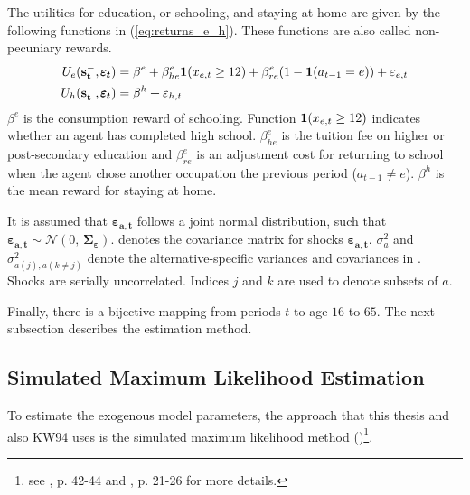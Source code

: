 The utilities for education, or schooling, and staying at home are given by the following functions in (\ref{eq:returns_e_h}). These functions are also called non-pecuniary rewards.
\begin{equation} \label{eq:returns_e_h}
\begin{aligned}
U_e(\bold{s_t^-}, \pmb{\varepsilon_t}) &= \beta^e + \beta_{he}^e \bold 1(x_{e,t} \geq 12) + \beta_{re}^e(1-\bold1(a_{t-1}=e)) + \varepsilon_{e,t} \\
U_h(\bold{s_t^-},\pmb{\varepsilon_t}) &= \beta^h + \varepsilon_{h,t} \\
\end{aligned}
\end{equation}
\noindent
$\beta^e$ is the consumption reward of schooling. Function $\bold 1(x_{e,t} \geq 12)$ indicates whether an agent has completed high school. $\beta_{he}^e$ is the tuition fee on higher or post-secondary education and $\beta_{re}^e$ is an adjustment cost for returning to school when the agent chose another occupation the previous period ($a_{t-1}\neq e$). $\beta^h$ is the mean reward for staying at home.

It is assumed that $\pmb{\varepsilon_{a,t}}$ follows a joint normal distribution, such that $\pmb{\varepsilon_{a,t}} \sim \mathcal{N}(0,\,\pmb{\Sigma_\varepsilon})$. \pmb{$\Sigma_\varepsilon$} denotes the covariance matrix for shocks $\pmb{\varepsilon_{a,t}}$. $\sigma_a^{2}$ and $\sigma^{2}_{a(j),a(k\neq j)}$ denote the alternative-specific variances and covariances in \pmb{$\Sigma_\varepsilon$}. Shocks are serially uncorrelated. Indices $j$ and $k$ are used to denote subsets of $a$.

Finally, there is a bijective mapping from periods $t$ to age $16$ to $65$. The next subsection describes the estimation method.

\subsection{Simulated Maximum Likelihood Estimation}

To estimate the exogenous model parameters, the approach that this thesis and also KW94 uses is the simulated maximum likelihood method (\cite{Albright.1977})\footnote{see \cite{Aguirregabiria.2010}, p. 42-44 and \cite{Raabe.2019}, p. 21-26 for more details.}.

